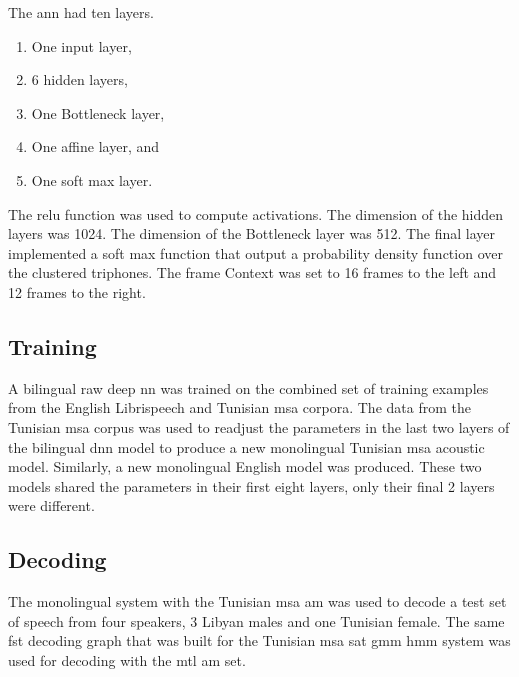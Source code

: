 The \gls{ann} had ten layers.

\begin{enumerate}
\item One input layer,
\item 6 hidden layers,
\item One Bottleneck layer,
\item One affine layer, and
\item One soft max layer.
\end{enumerate}


The \gls{relu} function was used to compute activations.
The dimension of the hidden layers was 1024.
The dimension of the Bottleneck layer was 512.
The final layer implemented  a soft max function that output a probability density function over the clustered triphones.
The frame Context was set to 16 frames to the left and 12 frames to the right.

\subsection{Training}
\label{sec:train}


A bilingual raw deep \gls{nn}  was trained on the combined set of training examples from the English Librispeech and Tunisian \gls{msa}  corpora.
The data from the Tunisian \gls{msa} corpus was used to readjust the parameters in the last two layers of the bilingual \gls{dnn} model to produce a new monolingual Tunisian \gls{msa}  acoustic model. 
Similarly, a new monolingual English model was produced.
These two models shared the parameters in their first eight layers, only their final 2 layers were different.

\subsection{Decoding}
\label{sec:decode}


The monolingual system with the Tunisian \gls{msa} \gls{am} was used to decode a test set of speech from four speakers, 3 Libyan males and one Tunisian female.
The same \gls{fst} decoding graph that was built for the Tunisian \gls{msa} \gls{sat} \gls{gmm} \gls{hmm} system was used for decoding with the \gls{mtl} \gls{am} set.
